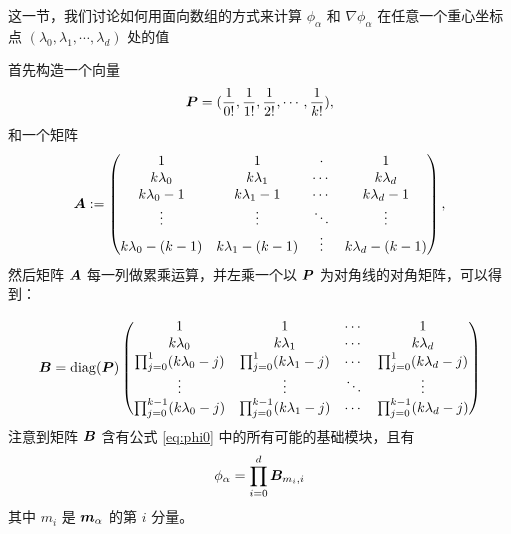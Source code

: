 \documentclass{article}
\begin{document}
这一节，我们讨论如何用面向数组的方式来计算 $\phi_\alpha$ 和 $\nabla \phi_\alpha$
在任意一个重心坐标点 $(\lambda_0, \lambda_1, \cdots, \lambda_d)$ 处的值

首先构造一个向量
\begin{equation*}
    {\boldsymbol P} = (\frac{1}{0!}, \frac{1}{1!}, \frac{1}{2!}, \cdots, \frac{1}{k!}),
\end{equation*}
和一个矩阵
\begin{equation}\label{eq:A}
{\boldsymbol A} :=                                                                            
\begin{pmatrix}  
1  &  1  & \cdot & 1 \\
k\lambda_0 & k\lambda_1 & \cdots & k\lambda_d\\                                             
k\lambda_0 - 1 & k\lambda_1 - 1 & \cdots & k\lambda_d - 1\\   
\vdots & \vdots & \ddots & \vdots \\                                                     
k\lambda_0 - (k - 1) & k\lambda_1 - (k - 1) & \vdots & k\lambda_d - (k - 1)
\end{pmatrix},
\end{equation}
然后矩阵 ${\boldsymbol A}$ 每一列做累乘运算，并左乘一个以 ${\boldsymbol P}$ 为对角线的对角矩阵，可以得
到：

\begin{equation}\label{eq:B}
{\boldsymbol B} = \mathrm{diag}({\boldsymbol P})
\begin{pmatrix}
1 & 1 & \cdots & 1 \\
k\lambda_0 & k\lambda_1 & \cdots & k\lambda_d\\
\prod_{j=0}^{1}(k\lambda_0 - j) & \prod_{j=0}^{1}(k\lambda_1 - j)
& \cdots & \prod_{j=0}^{1}(k\lambda_d - j) \\
\vdots & \vdots & \ddots & \vdots \\
\prod_{j=0}^{k-1}(k\lambda_0 - j) & \prod_{j=0}^{k-1}(k\lambda_1 - j) & \cdots & \prod_{j=0}^{k-1}(k\lambda_d - j) 
\end{pmatrix}
\end{equation}
注意到矩阵 ${\boldsymbol B}$ 含有公式 \eqref{eq:phi0} 中的所有可能的基础模块，且有 
\begin{equation*}
    \phi_\alpha = \prod_{i=0}^d{\boldsymbol B}_{m_i, i}
\end{equation*}
其中 $m_i$ 是 ${\boldsymbol m}_\alpha$ 的第 $i$ 分量。
\end{document}
